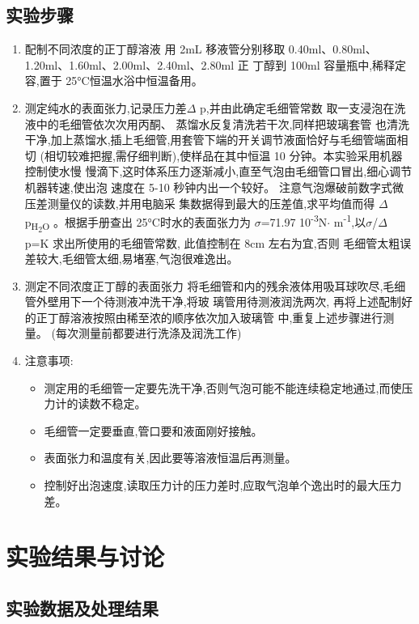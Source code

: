 \documentclass[11pt]{report}
\begin{document}
\section{实验步骤}
\label{sec:org1d04df5}
\begin{enumerate}
\item 配制不同浓度的正丁醇溶液
\label{sec:orgc484ddd}
用 2mL 移液管分别移取 0.40ml、0.80ml、1.20ml、1.60ml、2.00ml、2.40ml、2.80ml 正
丁醇到 100ml 容量瓶中,稀释定容,置于 25°C恒温水浴中恒温备用。
\item 测定纯水的表面张力,记录压力差\(\Delta\) p,并由此确定毛细管常数
\label{sec:org65153d6}
取一支浸泡在洗液中的毛细管依次次用丙酮、 蒸馏水反复清洗若干次,同样把玻璃套管
也清洗干净,加上蒸馏水,插上毛细管,用套管下端的开关调节液面恰好与毛细管端面相切
(相切较难把握,需仔细判断),使样品在其中恒温 10 分钟。本实验采用机器控制使水慢
慢滴下,这时体系压力逐渐减小,直至气泡由毛细管口冒出,细心调节机器转速,使出泡
速度在 5-10 秒钟内出一个较好。 注意气泡爆破前数字式微压差测量仪的读数,并用电脑采
集数据得到最大的压差值,求平均值而得 \(\Delta\) p\textsubscript{H\textsubscript{2}O} 。根据手册查出 25°C时水的表面张力为
\(\sigma\)=71.97\texttimes{} 10\textsuperscript{-3}N\(\cdot\) m\textsuperscript{-1},以\(\sigma\)/\(\Delta\) p=K 求出所使用的毛细管常数,
此值控制在 8cm 左右为宜,否则
毛细管太粗误差较大,毛细管太细,易堵塞,气泡很难逸出。
\item 测定不同浓度正丁醇的表面张力
\label{sec:orgc8f452b}
将毛细管和内的残余液体用吸耳球吹尽,毛细管外壁用下一个待测液冲洗干净,将玻
璃管用待测液润洗两次, 再将上述配制好的正丁醇溶液按照由稀至浓的顺序依次加入玻璃管
中,重复上述步骤进行测量。
 (每次测量前都要进行洗涤及润洗工作)
\item 注意事项:
\label{sec:org233f4a4}
\begin{itemize}
\item 测定用的毛细管一定要先洗干净,否则气泡可能不能连续稳定地通过,而使压力计的读数不稳定。
\item 毛细管一定要垂直,管口要和液面刚好接触。
\item 表面张力和温度有关,因此要等溶液恒温后再测量。
\item 控制好出泡速度,读取压力计的压力差时,应取气泡单个逸出时的最大压力差。
\end{itemize}
\end{enumerate}

\chapter{实验结果与讨论}
\label{sec:orgaf3b164}
\section{实验数据及处理结果}
\label{sec:orgad339a6}
\end{document}
